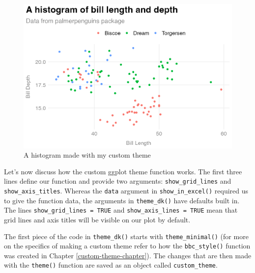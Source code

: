 \documentclass[
]{book}
\begin{document}
\begin{figure}
\includegraphics[width=1\linewidth]{packages_files/figure-latex/theme-dk-histogram-1} \caption{A histogram made with my custom theme}\label{fig:theme-dk-histogram}
\end{figure}

Let's now discuss how the custom ggplot theme function works. The first three lines define our function and provide two arguments: \texttt{show\_grid\_lines} and \texttt{show\_axis\_titles}. Whereas the \texttt{data} argument in \texttt{show\_in\_excel()} required us to give the function data, the arguments in \texttt{theme\_dk()} have defaults built in. The lines \texttt{show\_grid\_lines\ =\ TRUE} and \texttt{show\_axis\_lines\ =\ TRUE} mean that grid lines and axis titles will be visible on our plot by default.

The first piece of the code in \texttt{theme\_dk()} starts with \texttt{theme\_minimal()} (for more on the specifics of making a custom theme refer to how the \texttt{bbc\_style()} function was created in Chapter \ref{custom-theme-chapter}). The changes that are then made with the \texttt{theme()} function are saved as an object called \texttt{custom\_theme}.
\end{document}
